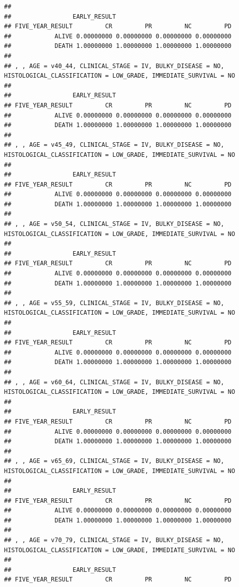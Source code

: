 \documentclass[]{article}
\begin{document}
\begin{verbatim}
## 
##                 EARLY_RESULT
## FIVE_YEAR_RESULT         CR         PR         NC         PD
##            ALIVE 0.00000000 0.00000000 0.00000000 0.00000000
##            DEATH 1.00000000 1.00000000 1.00000000 1.00000000
## 
## , , AGE = v40_44, CLINICAL_STAGE = IV, BULKY_DISEASE = NO, HISTOLOGICAL_CLASSIFICATION = LOW_GRADE, IMMEDIATE_SURVIVAL = NO
## 
##                 EARLY_RESULT
## FIVE_YEAR_RESULT         CR         PR         NC         PD
##            ALIVE 0.00000000 0.00000000 0.00000000 0.00000000
##            DEATH 1.00000000 1.00000000 1.00000000 1.00000000
## 
## , , AGE = v45_49, CLINICAL_STAGE = IV, BULKY_DISEASE = NO, HISTOLOGICAL_CLASSIFICATION = LOW_GRADE, IMMEDIATE_SURVIVAL = NO
## 
##                 EARLY_RESULT
## FIVE_YEAR_RESULT         CR         PR         NC         PD
##            ALIVE 0.00000000 0.00000000 0.00000000 0.00000000
##            DEATH 1.00000000 1.00000000 1.00000000 1.00000000
## 
## , , AGE = v50_54, CLINICAL_STAGE = IV, BULKY_DISEASE = NO, HISTOLOGICAL_CLASSIFICATION = LOW_GRADE, IMMEDIATE_SURVIVAL = NO
## 
##                 EARLY_RESULT
## FIVE_YEAR_RESULT         CR         PR         NC         PD
##            ALIVE 0.00000000 0.00000000 0.00000000 0.00000000
##            DEATH 1.00000000 1.00000000 1.00000000 1.00000000
## 
## , , AGE = v55_59, CLINICAL_STAGE = IV, BULKY_DISEASE = NO, HISTOLOGICAL_CLASSIFICATION = LOW_GRADE, IMMEDIATE_SURVIVAL = NO
## 
##                 EARLY_RESULT
## FIVE_YEAR_RESULT         CR         PR         NC         PD
##            ALIVE 0.00000000 0.00000000 0.00000000 0.00000000
##            DEATH 1.00000000 1.00000000 1.00000000 1.00000000
## 
## , , AGE = v60_64, CLINICAL_STAGE = IV, BULKY_DISEASE = NO, HISTOLOGICAL_CLASSIFICATION = LOW_GRADE, IMMEDIATE_SURVIVAL = NO
## 
##                 EARLY_RESULT
## FIVE_YEAR_RESULT         CR         PR         NC         PD
##            ALIVE 0.00000000 0.00000000 0.00000000 0.00000000
##            DEATH 1.00000000 1.00000000 1.00000000 1.00000000
## 
## , , AGE = v65_69, CLINICAL_STAGE = IV, BULKY_DISEASE = NO, HISTOLOGICAL_CLASSIFICATION = LOW_GRADE, IMMEDIATE_SURVIVAL = NO
## 
##                 EARLY_RESULT
## FIVE_YEAR_RESULT         CR         PR         NC         PD
##            ALIVE 0.00000000 0.00000000 0.00000000 0.00000000
##            DEATH 1.00000000 1.00000000 1.00000000 1.00000000
## 
## , , AGE = v70_79, CLINICAL_STAGE = IV, BULKY_DISEASE = NO, HISTOLOGICAL_CLASSIFICATION = LOW_GRADE, IMMEDIATE_SURVIVAL = NO
## 
##                 EARLY_RESULT
## FIVE_YEAR_RESULT         CR         PR         NC         PD

\end{verbatim}
\end{document}
